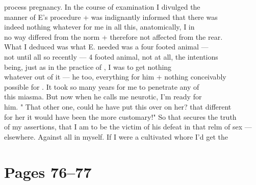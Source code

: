 \documentclass[11pt,a4paper]{article}
\begin{document}
{process pregnancy. In the course of examination I divulged the \\
manner of E's procedure + was indignantly informed that there was \\
indeed nothing whatever for me in all this, anatomically, I in \\
no way differed from the norm + therefore  not affected from the rear. \\
What I deduced was what E. needed was a four footed animal --- \\
not until all so recently --- 4 footed animal, not at all, the intentions \\
being, just as in the practice of , I was to get nothing \\
whatever out of it --- he too, everything for him + nothing conceivably \\
possible for . It took so many years for me to penetrate any of \\
this miasma. But now when he calls me neurotic, I'm ready for \\
him. " That other one, could he have put this over on her? that different \\
for her it would have been the more customary!" So that secures the truth \\
of my assertions, that I am to be the victim of his defeat in that relm of sex --- \\
elsewhere. Against all in myself. If I were a cultivated whore I'd get the}





\section{Pages 76--77}
\end{document}

